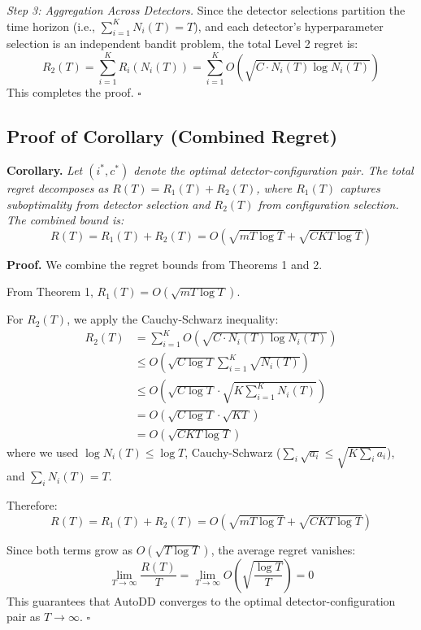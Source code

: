 \documentclass[11pt]{article}
\begin{document}
\textit{Step 3: Aggregation Across Detectors.}
Since the detector selections partition the time horizon (i.e., $\sum_{i=1}^K N_i(T) = T$), and each detector's hyperparameter selection is an independent bandit problem, the total Level 2 regret is:
\begin{equation}
R_2(T) = \sum_{i=1}^{K} R_i(N_i(T)) = \sum_{i=1}^{K} O(\sqrt{C \cdot N_i(T) \log N_i(T)})
\end{equation}
This completes the proof. \hfill $\square$

\subsection{Proof of Corollary (Combined Regret)}

\textbf{Corollary.} \textit{Let $(i^*, c^*)$ denote the optimal detector-configuration pair. The total regret decomposes as $R(T) = R_1(T) + R_2(T)$, where $R_1(T)$ captures suboptimality from detector selection and $R_2(T)$ from configuration selection. The combined bound is:}
\begin{equation}
R(T) = R_1(T) + R_2(T) = O(\sqrt{mT \log T} + \sqrt{CKT \log T})
\end{equation}

\textbf{Proof.} We combine the regret bounds from Theorems 1 and 2.

From Theorem 1, $R_1(T) = O(\sqrt{mT \log T})$.

For $R_2(T)$, we apply the Cauchy-Schwarz inequality:
\begin{align}
R_2(T) &= \sum_{i=1}^{K} O(\sqrt{C \cdot N_i(T) \log N_i(T)}) \\
&\leq O\left(\sqrt{C \log T} \sum_{i=1}^{K} \sqrt{N_i(T)}\right) \\
&\leq O\left(\sqrt{C \log T} \cdot \sqrt{K \sum_{i=1}^{K} N_i(T)}\right) \\
&= O\left(\sqrt{C \log T} \cdot \sqrt{KT}\right) \\
&= O(\sqrt{CKT \log T})
\end{align}
where we used $\log N_i(T) \leq \log T$, Cauchy-Schwarz ($\sum_i \sqrt{a_i} \leq \sqrt{K \sum_i a_i}$), and $\sum_i N_i(T) = T$.

Therefore:
\begin{equation}
R(T) = R_1(T) + R_2(T) = O(\sqrt{mT \log T} + \sqrt{CKT \log T})
\end{equation}

Since both terms grow as $O(\sqrt{T \log T})$, the average regret vanishes:
\begin{equation}
\lim_{T \to \infty} \frac{R(T)}{T} = \lim_{T \to \infty} O\left(\sqrt{\frac{\log T}{T}}\right) = 0
\end{equation}
This guarantees that AutoDD converges to the optimal detector-configuration pair as $T \to \infty$. \hfill $\square$
\end{document}
